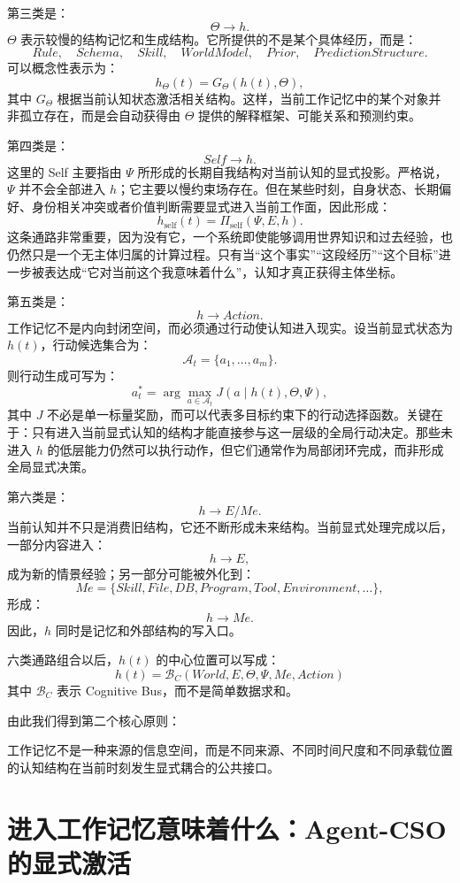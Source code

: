 第三类是：
\[
\Theta\rightarrow h.
\]
$\Theta$ 表示较慢的结构记忆和生成结构。它所提供的不是某个具体经历，而是：
\[
Rule,\quad Schema,\quad Skill,\quad WorldModel,\quad Prior,\quad PredictionStructure.
\]
可以概念性表示为：
\[
h_\Theta(t)
=
G_\Theta
\left(
h(t),
\Theta
\right),
\]
其中 $G_\Theta$ 根据当前认知状态激活相关结构。这样，当前工作记忆中的某个对象并非孤立存在，而是会自动获得由 $\Theta$ 提供的解释框架、可能关系和预测约束。

第四类是：
\[
Self\rightarrow h.
\]
这里的 Self 主要指由 $\Psi$ 所形成的长期自我结构对当前认知的显式投影。严格说，$\Psi$ 并不会全部进入 $h$；它主要以慢约束场存在。但在某些时刻，自身状态、长期偏好、身份相关冲突或者价值判断需要显式进入当前工作面，因此形成：
\[
h_{\mathrm{self}}(t)
=
\Pi_{\mathrm{self}}
\left(
\Psi,E,h
\right).
\]
这条通路非常重要，因为没有它，一个系统即使能够调用世界知识和过去经验，也仍然只是一个无主体归属的计算过程。只有当“这个事实”“这段经历”“这个目标”进一步被表达成“它对当前这个我意味着什么”，认知才真正获得主体坐标。

第五类是：
\[
h\rightarrow Action.
\]
工作记忆不是内向封闭空间，而必须通过行动使认知进入现实。设当前显式状态为 $h(t)$，行动候选集合为：
\[
\mathcal A_t
=
\{a_1,\dots,a_m\}.
\]
则行动生成可写为：
\[
a_t^*
=
\arg\max_{a\in\mathcal A_t}
J(a\mid h(t),\Theta,\Psi),
\]
其中 $J$ 不必是单一标量奖励，而可以代表多目标约束下的行动选择函数。关键在于：只有进入当前显式认知的结构才能直接参与这一层级的全局行动决定。那些未进入 $h$ 的低层能力仍然可以执行动作，但它们通常作为局部闭环完成，而非形成全局显式决策。

第六类是：
\[
h\rightarrow E/Me.
\]
当前认知并不只是消费旧结构，它还不断形成未来结构。当前显式处理完成以后，一部分内容进入：
\[
h\rightarrow E,
\]
成为新的情景经验；另一部分可能被外化到：
\[
Me
=
\{
Skill,File,DB,Program,Tool,Environment,\ldots
\},
\]
形成：
\[
h\rightarrow Me.
\]
因此，$h$ 同时是记忆和外部结构的写入口。

六类通路组合以后，$h(t)$ 的中心位置可以写成：
\[
\boxed{
h(t)
=
\mathcal B_C
\left(
World,
E,
\Theta,
\Psi,
Me,
Action
\right)
}
\]
其中 $\mathcal B_C$ 表示 Cognitive Bus，而不是简单数据求和。

由此我们得到第二个核心原则：
\begin{proposition*}
工作记忆不是一种来源的信息空间，而是不同来源、不同时间尺度和不同承载位置的认知结构在当前时刻发生显式耦合的公共接口。
\end{proposition*}

\section{进入工作记忆意味着什么：Agent-CSO 的显式激活}

